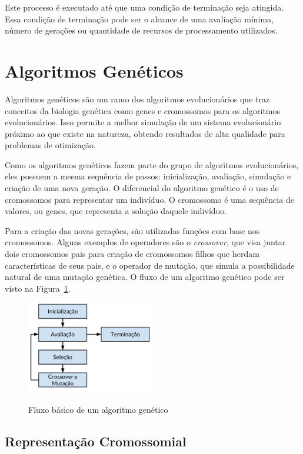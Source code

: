 \documentclass[12pt,oneside,a4paper,english,french,spanish,brazil,]{abntex2}
\begin{document}
Este processo é executado até que uma condição de terminação seja atingida. Essa condição de terminação pode ser o alcance de uma avaliação mínima, número de gerações ou quantidade de recursos de processamento utilizados.

\section{Algoritmos Genéticos}

Algoritmos genéticos são um ramo dos algoritmos evolucionários que traz conceitos da biologia genética como genes e cromossomos para os algoritmos evolucionários. Isso permite a melhor simulação de um sistema evolucionário próximo ao que existe na natureza, obtendo resultados de alta qualidade para problemas de otimização.

Como os algoritmos genéticos fazem parte do grupo de algoritmos evolucionários, eles possuem a mesma sequência de passos: inicialização, avaliação, simulação e criação de uma nova geração. O diferencial do algoritmo genético é o uso de cromossomos para representar um indivíduo. O cromossomo é uma sequência de valores, ou genes, que representa a solução daquele indivíduo.

Para a criação das novas gerações, são utilizadas funções com base nos cromossomos. Alguns exemplos de operadores são o \textit{crossover}, que visa juntar dois cromossomos pais para criação de cromossomos filhos que herdam características de seus pais, e o operador de mutação, que simula a possibilidade natural de uma mutação genética. O fluxo de um algoritmo genético pode ser visto na Figura~\ref{fig:GA_Fluxo}.

\begin{figure}[ht]
\centering
\caption{Fluxo básico de um algoritmo genético}
\includegraphics[width=0.5\textwidth]{imagens/GA_Fluxo.pdf}
\label{fig:GA_Fluxo}
\end{figure}

\subsection{Representação Cromossomial}
\end{document}
